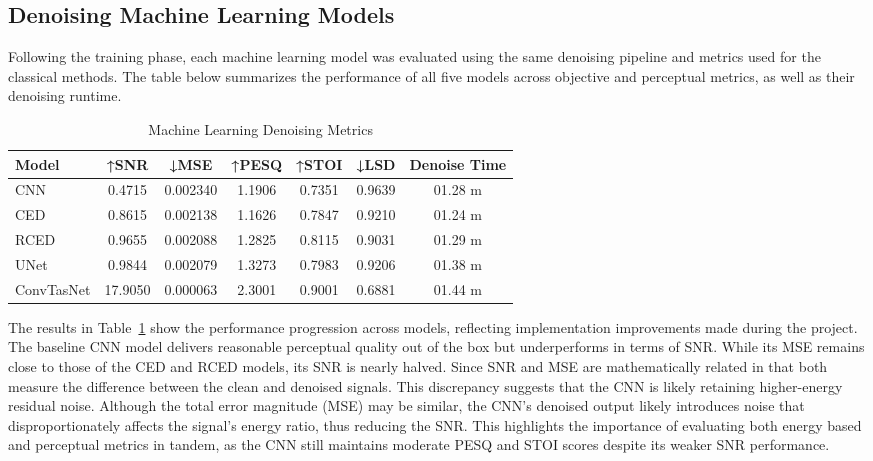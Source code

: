 \subsection{Denoising Machine Learning Models}
\label{sec:denoising_ml_models}

Following the training phase, each machine learning model was evaluated using the same denoising pipeline and metrics used for the classical methods. The table below summarizes the performance of all five models across objective and perceptual metrics, as well as their denoising runtime.

\vspace{1em}
\begin{table}[H]
\centering
\caption{Machine Learning Denoising Metrics}
\label{tab:ml_denoise}
\begin{tabular}{|l|c|c|c|c|c|c|}
\hline
\textbf{Model} & \textbf{↑SNR} & \textbf{↓MSE} & \textbf{↑PESQ} & \textbf{↑STOI} & \textbf{↓LSD} & \textbf{Denoise Time} \\
\hline
CNN         & 0.4715  & 0.002340 & 1.1906 & 0.7351 & 0.9639 & 01.28 m \\
CED         & 0.8615  & 0.002138 & 1.1626 & 0.7847 & 0.9210 & 01.24 m \\
RCED        & 0.9655  & 0.002088 & 1.2825 & 0.8115 & 0.9031 & 01.29 m \\
UNet        & 0.9844  & 0.002079 & 1.3273 & 0.7983 & 0.9206 & 01.38 m \\
ConvTasNet  & 17.9050 & 0.000063 & 2.3001 & 0.9001 & 0.6881 & 01.44 m \\
\hline
\end{tabular}
\end{table}

The results in Table~\ref{tab:ml_denoise} show the performance progression across models, reflecting implementation improvements made during the project. The baseline CNN model delivers reasonable perceptual quality out of the box but underperforms in terms of SNR. While its MSE remains close to those of the CED and RCED models, its SNR is nearly halved. Since SNR and MSE are mathematically related in that both measure the difference between the clean and denoised signals. This discrepancy suggests that the CNN is likely retaining higher-energy residual noise. Although the total error magnitude (MSE) may be similar, the CNN's denoised output likely introduces noise that disproportionately affects the signal's energy ratio, thus reducing the SNR. This highlights the importance of evaluating both energy based and perceptual metrics in tandem, as the CNN still maintains moderate PESQ and STOI scores despite its weaker SNR performance.

